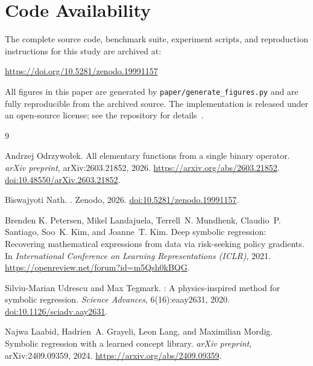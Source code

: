 \documentclass[11pt,a4paper]{article}
\begin{document}
\section*{Code Availability}
The complete source code, benchmark suite, experiment scripts, and
reproduction instructions for this study are archived at:
\begin{center}
  \url{https://doi.org/10.5281/zenodo.19991157}
\end{center}
All figures in this paper are generated by \texttt{paper/generate\_figures.py}
and are fully reproducible from the archived source.
The implementation is released under an open-source license;
see the repository for details~\cite{eml_framework_2026}.


\begin{thebibliography}{9}

Andrzej Odrzywo{\l}ek.
\newblock All elementary functions from a single binary operator.
\newblock \textit{arXiv preprint}, arXiv:2603.21852, 2026.
\newblock \url{https://arxiv.org/abs/2603.21852}.
\newblock \href{https://doi.org/10.48550/arXiv.2603.21852}%
               {doi:10.48550/arXiv.2603.21852}.

Biswajyoti Nath.
.
\newblock Zenodo, 2026.
\newblock \href{https://doi.org/10.5281/zenodo.19991157}%
               {doi:10.5281/zenodo.19991157}.

Brenden K. Petersen, Mikel Landajuela, Terrell~N. Mundhenk,
  Claudio~P. Santiago, Soo~K. Kim, and Joanne~T. Kim.
\newblock Deep symbolic regression: Recovering mathematical expressions from
  data via risk-seeking policy gradients.
\newblock In \textit{International Conference on Learning Representations
  (ICLR)}, 2021.
\newblock \url{https://openreview.net/forum?id=m5Qsh0kBQG}.

Silviu-Marian Udrescu and Max Tegmark.
: A physics-inspired method for symbolic regression.
\newblock \textit{Science Advances}, 6(16):eaay2631, 2020.
\newblock \href{https://doi.org/10.1126/sciadv.aay2631}%
               {doi:10.1126/sciadv.aay2631}.

Najwa Laabid, Hadrien~A. Grayeli, Leon Lang, and Maximilian Mordig.
\newblock Symbolic regression with a learned concept library.
\newblock \textit{arXiv preprint}, arXiv:2409.09359, 2024.
\newblock \url{https://arxiv.org/abs/2409.09359}.

\end{thebibliography}
\end{document}
